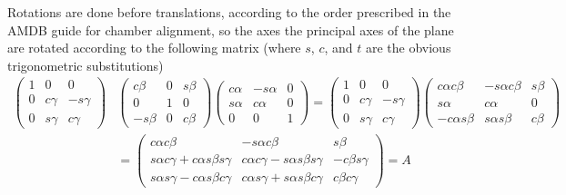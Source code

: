 Rotations are done before translations, according to the order prescribed in the AMDB guide for chamber alignment, so the axes the principal axes of the plane are rotated according to the following matrix (where $s$, $c$, and $t$ are the obvious trigonometric substitutions)
\begin{equation}
\begin{split}
\left(\begin{array}{ccc} 1&0&0\\ 0& c\gamma& -s\gamma\\ 0&s\gamma&c\gamma\end{array}\right)&
\left(\begin{array}{ccc} c\beta&0& s\beta\\0&1&0 \\ -s\beta&0&c\beta\end{array}\right)
\left(\begin{array}{ccc} c\alpha&-s\alpha&0\\s\alpha&c\alpha&0 \\ 0&0&1\end{array}\right)=
\left(\begin{array}{ccc} 1&0&0\\ 0& c\gamma& -s\gamma\\ 0&s\gamma&c\gamma\end{array}\right)
\left(\begin{array}{ccc} c\alpha c\beta&-s\alpha c\beta&s\beta\\ s\alpha& c\alpha& 0\\ -c\alpha s\beta& s\alpha s\beta& c\beta \end{array}\right)\\
&=\boxed{\left(\begin{array}{ccc} c\alpha c\beta& -s\alpha c\beta& s\beta\\s\alpha c\gamma+c\alpha s\beta s\gamma& c\alpha c\gamma-s\alpha s\beta s\gamma& -c\beta s\gamma\\s\alpha s\gamma-c\alpha s\beta c\gamma& c\alpha s\gamma+s\alpha s\beta c\gamma& c\beta c\gamma\end{array}\right)}=A
\end{split}
\end{equation}

